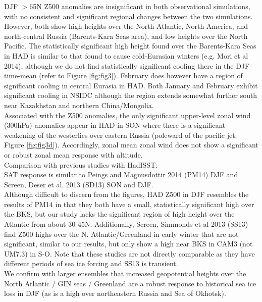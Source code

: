 \documentclass[twocol]{ametsoc}
\begin{document}
DJF $>$65N Z500 anomalies are insignificant in both observational simulations, with no consistent and significant regional changes between the two simulations. However, both show high heights over the North Atlantic, North America, and north-central Russia (Barents-Kara Seas area), and low heights over the North Pacific. The statistically significant high height found over the Barents-Kara Seas in HAD is similar to that found to cause cold-Eurasian winters (e.g. Mori et al 2014), although we do not find statistically significant cooling there in the DJF time-mean (refer to Figure \ref{fig:fig3}). February does however have a region of significant cooling in central Eurasia in HAD. Both January and February exhibit significant cooling in NSIDC although the region extends somewhat further south near Kazakhstan and northern China/Mongolia.\\

Associated with the Z500 anomalies, the only significant upper-level zonal wind (300hPa) anomalies appear in HAD in SON where there is a significant weakening of the westerlies over eastern Russia (poleward of the pacific jet; Figure \ref{fig:fig3d}). Accordingly, zonal mean zonal wind does not show a significant or robust zonal mean response with altitude.\\

Comparison with previous studies with HadISST:\\
SAT response is similar to Peings and Magnusdottir 2014 (PM14) DJF and Screen, Deser et al. 2013 (SD13) SON and DJF. \\
Although difficult to discern from the figures, HAD Z500 in DJF resembles the results of PM14 in that they both have a small, statistically significant high over the BKS, but our study lacks the significant region of high height over the Atlantic from about 30-45N. Additionally, Screen, Simmonds et al 2013 (SS13) find Z500 highs over the N. Atlantic/Greenland in early winter that are not significant, similar to our results, but only show a high near BKS in CAM3 (not UM7.3) in S-O. Note that these studies are not directly comparable as they have different periods of sea ice forcing and SS13 is transient.\\
We confirm with larger ensembles that increased geopotential heights over the North Atlantic / GIN seas / Greenland are a robust response to historical sea ice loss in DJF (as is a high over northeastern Russia and Sea of Okhotsk).\\ %
\end{document}
